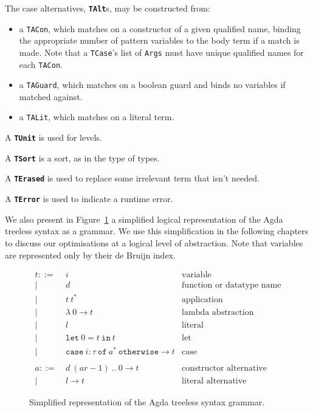 The case alternatives, \textbf{\lstinline{TAlt}}s, may be constructed from:
\begin{itemize}
\item a \lstinline{TACon}, which matches on a constructor of a given qualified name, binding the appropriate number of pattern variables to the body term if a match is made. Note that a \lstinline{TCase}'s list of \lstinline{Args} must have unique qualified names for each \lstinline{TACon}.
\item a \lstinline{TAGuard}, which matches on a boolean guard and binds no variables if matched against.
\item a \lstinline{TALit}, which matches on a literal term.
\end{itemize}

A \textbf{\lstinline{TUnit}} is used for levels.

A \textbf{\lstinline{TSort}} is a sort, as in the type of types.

A \textbf{\lstinline{TErased}} is used to replace some irrelevant term that isn't needed.

A \textbf{\lstinline{TError}} is used to indicate a runtime error.


We also present in Figure~\ref{fig:treeless_grammar} a simplified logical representation of the Agda treeless syntax as a grammar. We use this simplification in the following chapters to discuss our optimisations at a logical level of abstraction. Note that variables are represented only by their de Bruijn index.


\begin{figure}[h!]
\begin{align*}
t ::=~& i & \text{variable}\\
|~& d & \text{function or datatype name}\\
|~& t~t^* & \text{application}\\
|~& \lambda~0 \to t & \text{lambda abstraction}\\
|~& l & \text{literal}\\
|~& \mathtt{let}~0 = t~\mathtt{in}~t & \text{let}\\
|~& \mathtt{case}~i : \tau~\mathtt{of}~a^*~\mathtt{otherwise} \to t& \text{case}\\
\\
a ::=~& d~(ar-1)~..~0 \to t & \text{constructor alternative}\\
|~& l \to t & \text{literal alternative}
\end{align*}
\caption{Simplified representation of the Agda treeless syntax grammar.}
\label{fig:treeless_grammar}
\end{figure}

